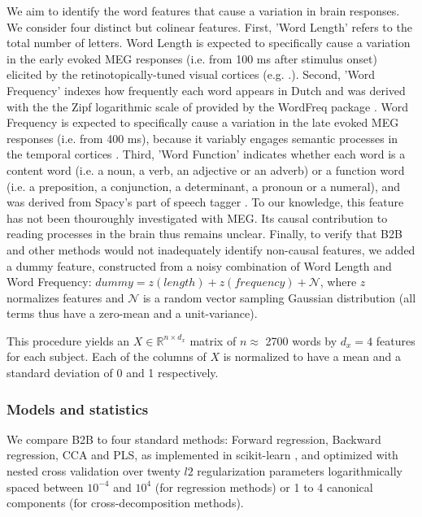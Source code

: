 We aim to identify the word features that cause a variation in brain responses. We consider four distinct but colinear features.
%
First, 'Word Length' refers to the total number of letters. Word Length is expected to specifically cause a variation in the early evoked MEG responses (i.e. from 100 ms after stimulus onset) elicited by the retinotopically-tuned visual cortices (e.g. \citep{pegado2014timing}.).
%
Second, 'Word Frequency' indexes how frequently each word appears in Dutch and was derived with the the Zipf logarithmic scale of \citep{van2014subtlex} provided by the WordFreq package \citep{speerwordfreq}. Word Frequency is expected to specifically cause a variation in the late evoked MEG responses (i.e. from 400 ms), because it variably engages semantic processes in the temporal cortices \citep{kutas2011thirty}.
%
Third, 'Word Function' indicates whether each word is a content word (i.e. a noun, a verb, an adjective or an adverb) or a function word (i.e. a preposition, a conjunction, a determinant, a pronoun or a numeral), and was derived from Spacy's part of speech tagger \citep{spacy2}. To our knowledge, this feature has not been thouroughly investigated with MEG. Its causal contribution to reading processes in the brain thus remains unclear.
%
Finally, to verify that B2B and other methods would not inadequately identify non-causal features, we added a dummy feature, constructed from a noisy combination of Word Length and Word Frequency:
$dummy = z(length) + z(frequency) + \mathcal{N}$, where $z$ normalizes features and $\mathcal{N}$ is a random vector sampling Gaussian distribution (all terms thus have a zero-mean and a unit-variance).

This procedure yields an $X \in \mathbb{R}^{n \times d_x}$ matrix of $n\approx$ 2700 words by
$d_x=4$ features for each subject. Each of the columns of $X$ is normalized to
have a mean and a standard deviation of 0 and 1 respectively.

\subsubsection{Models and statistics}

We compare B2B to four standard methods: Forward regression, Backward regression, CCA and PLS, as implemented in scikit-learn \citep{sklearn}, and optimized with nested cross validation over twenty $l2$ regularization parameters logarithmically spaced between $10^{-4}$ and $10^4$ (for regression methods) or 1 to 4 canonical components (for cross-decomposition methods).

